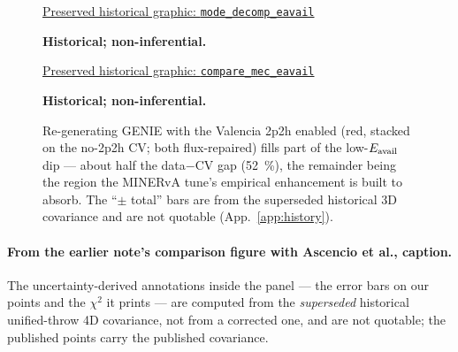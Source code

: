 \begin{figure}[H]
  \centering
  \begin{minipage}{0.49\textwidth}
    \centering
  \par\href{https://github.com/josephbaileyy/MINERvA-OmniFold/blob/3892e769043cddebfd58ec19e1ab1a567eb01784/docs/analysis-note/figures/mode_decomp_eavail.pdf}{Preserved historical graphic: \texttt{mode\_decomp\_eavail}} \par\smallskip\textbf{Historical; non-inferential.}
    \caption{Central-value $d\sigma/d\Eavail$ decomposed by interaction mode and overlaid with the unfolded data. The data excess is localized to the quasielastic--$\Delta$ dip ($\Eavail\le\SI{0.4}{GeV}$), the shape and size of a missing 2p2h component. The ``$\pm$ total'' error bars are from the superseded historical 3D covariance and are not quotable (App.~\ref{app:history}).}
    \label{fig:modedecomp-superseded}
  \end{minipage}\hfill
  \begin{minipage}{0.49\textwidth}
    \centering
  \par\href{https://github.com/josephbaileyy/MINERvA-OmniFold/blob/3892e769043cddebfd58ec19e1ab1a567eb01784/docs/analysis-note/figures/compare_mec_eavail.pdf}{Preserved historical graphic: \texttt{compare\_mec\_eavail}} \par\smallskip\textbf{Historical; non-inferential.}
    \caption{Re-generating GENIE with the Valencia 2p2h enabled (red, stacked on the no-2p2h CV; both flux-repaired) fills part of the low-$E_{\mathrm{avail}}$ dip --- about half the data$-$CV gap (\SI{52}{\percent}), the remainder being the region the MINERvA tune's empirical enhancement is built to absorb. The ``$\pm$ total'' bars are from the superseded historical 3D covariance and are not quotable (App.~\ref{app:history}).}
    \label{fig:mec-superseded}
  \end{minipage}
\end{figure}

\paragraph{From the earlier note's comparison figure with Ascencio et al., caption.} The uncertainty-derived annotations inside the panel --- the error bars on our points and the $\chi^{2}$ it prints --- are computed from the \emph{superseded} historical unified-throw 4D covariance, not from a corrected one, and are not quotable; the published points carry the published covariance.

